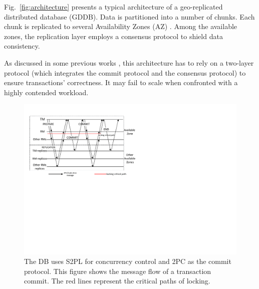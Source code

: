 \documentclass[conference]{IEEEtran}
\begin{document}
Fig.~\ref{fig:architecture} presents a typical architecture of a geo-replicated distributed database (GDDB).
Data is partitioned into a number of chunks.
Each chunk is replicated to several Availability Zones (AZ) \cite{Aurora:conf/sigmod/VerbitskiGSCGBM18}.
Among the available zones, the replication layer employs a consensus protocol to shield data consistency.

As discussed in some previous works \cite{Calvin:conf/sigmod/ThomsonDWRSA12}\cite{Tapir:conf/sosp/ZhangSSKP15}\cite{Janus:conf/osdi/MuNLL16},
this architecture has to rely on a two-layer protocol (which integrates the commit protocol and the consensus protocol) to ensure transactions' correctness.
It may fail to scale when confronted with a highly contended workload.


\begin{figure}[tbp]
  \centerline{\includegraphics[scale=0.60]{figure/message_flow.pdf}}
  \caption
  {
The DB uses S2PL for concurrency control and 2PC as the commit protocol.
This figure shows the message flow of a transaction commit.
The red lines represent the critical paths of locking.
    }
\label{fig:message_flow}
\end{figure}
\end{document}
